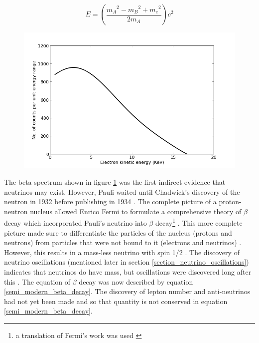 \begin{equation}
    E = \left( \frac{{m_A}^2 - {m_B}^2 + {m_e}^2}{2m_A}\right) c^2
    \label{constant_ke_e_equation}
\end{equation}

\begin{figure}[!h]
 \centering
 \includegraphics[width=0.7\linewidth]{Chapter1/Figs/Raster/beta_spectrum.png}
 \label{fig:beta_spectrum}
\end{figure}

The beta spectrum shown in figure \ref{fig:beta_spectrum} was the first indirect evidence that neutrinos may exist. However, Pauli waited until Chadwick's discovery of the neutron in 1932 \cite{chadwick1932possible} before publishing in 1934 \cite{lederman1970resource}. The complete picture of a proton-neutron nucleus allowed Enrico Fermi to formulate a comprehensive theory of $\beta$ decay which incorporated Pauli's neutrino into $\beta$ decay\footnote{a translation of Fermi's work was used \cite{wilson1968fermi}} \cite{lederman1970resource} \cite{Fermi:1934hr}. This more complete picture made sure to differentiate the particles of the nucleus (protons and neutrons) from particles that were not bound to it (electrons and neutrinos) \cite{Fermi:1934hr} \cite{wilson1968fermi}. However, this results in a mass-less neutrino with spin 1/2 \cite{lederman1970resource}. The discovery of neutrino oscillations (mentioned later in section \ref{section_neutrino_oscillations}) indicates that neutrinos do have mass, but oscillations were discovered long after this \cite{griffiths2008book} \cite{griffiths2008neutrino1.5}. The equation of $\beta$ decay was now described by equation \ref{semi_modern_beta_decay}. The discovery of lepton number and anti-neutrinos had not yet been made and so that quantity is not conserved in equation \ref{semi_modern_beta_decay}. 

